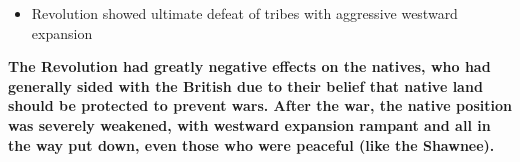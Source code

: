 \documentclass[a4paper]{article}
\begin{document}
{\begin{itemize}
\begin{itemize}
\begin{itemize}
                        \begin{itemize}
                            \item Killed 96 people
                        \end{itemize}
                        \item Massacres were not the norm, but revealed growing tensions
                    \end{itemize}
                    \item Revolution showed ultimate defeat of tribes with aggressive westward expansion
                \end{itemize}
            \end{itemize}
            \textbf{The Revolution had greatly negative effects on the natives, who had generally sided with the British due to their belief that native land should be protected to prevent wars. After the war, the native position was severely weakened, with westward expansion rampant and all in the way put down, even those who were peaceful (like the Shawnee).}}
\end{document}
